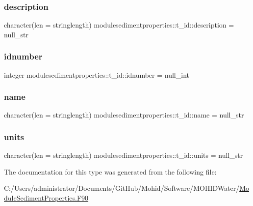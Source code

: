 \subsubsection{\texorpdfstring{description}{description}}
{\footnotesize\ttfamily character(len = stringlength) modulesedimentproperties\+::t\+\_\+id\+::description = null\+\_\+str\hspace{0.3cm}{\ttfamily [private]}}

\mbox{\label{structmodulesedimentproperties_1_1t__id_a87837ed3476fb5890bfc87f306607948}} 
\subsubsection{\texorpdfstring{idnumber}{idnumber}}
{\footnotesize\ttfamily integer modulesedimentproperties\+::t\+\_\+id\+::idnumber = null\+\_\+int\hspace{0.3cm}{\ttfamily [private]}}

\mbox{\label{structmodulesedimentproperties_1_1t__id_ac83333cae4b48e23b249da0e9ec62019}} 
\subsubsection{\texorpdfstring{name}{name}}
{\footnotesize\ttfamily character(len = stringlength) modulesedimentproperties\+::t\+\_\+id\+::name = null\+\_\+str\hspace{0.3cm}{\ttfamily [private]}}

\mbox{\label{structmodulesedimentproperties_1_1t__id_aa0d548eb3847819c9a6e410e4209cef8}} 
\subsubsection{\texorpdfstring{units}{units}}
{\footnotesize\ttfamily character(len = stringlength) modulesedimentproperties\+::t\+\_\+id\+::units = null\+\_\+str\hspace{0.3cm}{\ttfamily [private]}}



The documentation for this type was generated from the following file\+:\begin{DoxyCompactItemize}
\item 
C\+:/\+Users/administrator/\+Documents/\+Git\+Hub/\+Mohid/\+Software/\+M\+O\+H\+I\+D\+Water/\mbox{\hyperlink{_module_sediment_properties_8_f90}{Module\+Sediment\+Properties.\+F90}}\end{DoxyCompactItemize}
